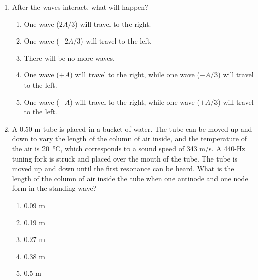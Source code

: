 \documentclass{../../../oss-apphys}
\begin{document}
\begin{multicols}{2}
\begin{enumerate}[leftmargin=18pt,resume]
  \item After the waves interact, what will happen?
    \label{des2}
    \begin{enumerate}[noitemsep,topsep=0pt,leftmargin=18pt,label=(\Alph*)]
    \item One wave ($2A/3$) will travel to the right.
    \item One wave ($-2A/3$) will travel to the left.
    \item There will be no more waves.
    \item One wave ($+A$) will travel to the right, while one wave ($-A/3$)
      will travel to the left.
    \item One wave ($-A$) will travel to the right, while one wave ($+A/3$)
      will travel to the left.
    \end{enumerate}
    \columnbreak
    
  \item A 0.50-m tube is placed in a bucket of water. The tube can be moved
    up and down to vary the length of the column of air inside, and the
    temperature of the air is \SI{20}{\celsius}, which corresponds to a sound
    speed of 343 m/s. A 440-Hz tuning fork is struck and placed over the mouth
    of the tube. The tube is moved up and down until the first resonance can be
    heard. What is the length of the column of air inside the tube when one
    antinode and one node form in the standing wave?
    \begin{enumerate}[noitemsep,topsep=0pt,leftmargin=18pt,label=(\Alph*)]
    \item 0.09 m
    \item 0.19 m
    \item 0.27 m
    \item 0.38 m
    \item 0.5 m
    \end{enumerate}
    
    

\end{enumerate}
\end{multicols}
\end{document}
